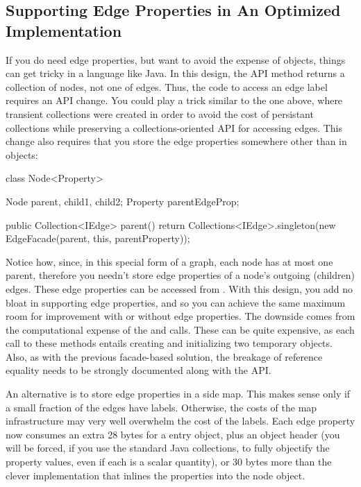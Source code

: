 \subsection{Supporting Edge Properties in An Optimized Implementation}

If you do need edge properties, but want to avoid the expense of 
objects, things can get tricky in a language like Java. In this design, the API
method  returns a collection of nodes, not one of edges.
Thus, the code to access an edge label requires an API change. You could play a
trick similar to the one above, where transient collections were created in
order to avoid the cost of persistant collections while preserving a
collections-oriented API for accessing edges. This change also requires that you
store the edge properties somewhere other than in  objects:

\begin{shortlisting}
class Node<Property> {
   Node parent, child1, child2;
   Property parentEdgeProp;
   
   public Collection<IEdge> parent() {
      return Collections<IEdge>.singleton(new EdgeFacade(parent, this, parentProperty));
   }
}
\end{shortlisting}
Notice how, since, in this special form of a graph, each node has at most one
parent, therefore you needn't store edge properties of a node's outgoing
(children) edges. These edge properties can be accessed from
. With this design, you add no bloat in
supporting edge properties, and so you can achieve the same maximum room for
improvement with or without edge properties. The downside comes from the
computational expense of the  and  calls. These
can be quite expensive, as each call to these methods entails creating and
initializing two temporary objects. Also, as with the previous facade-based
solution, the breakage of reference equality needs to be strongly documented
along with the API.

An alternative is to store edge properties in a side map.
This  makes sense only if a small
fraction of the edges have labels. Otherwise, the costs of the map
infrastructure may very well overwhelm the cost of the labels. Each
edge property now consumes an extra 28 bytes for a  entry object,
plus an object header (you will be forced, if you use the standard Java collections, to fully
objectify the property values, even if each is a scalar quantity), or 30 bytes
more than the clever implementation that inlines the properties into the node
object.

